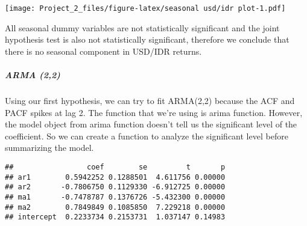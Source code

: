 \documentclass[]{article}
\newenvironment{Shaded}{\begin{snugshade}}{\end{snugshade}}
\newcommand{\KeywordTok}[1]{\textcolor[rgb]{0.13,0.29,0.53}{\textbf{#1}}}
\newcommand{\DataTypeTok}[1]{\textcolor[rgb]{0.13,0.29,0.53}{#1}}
\newcommand{\DecValTok}[1]{\textcolor[rgb]{0.00,0.00,0.81}{#1}}
\newcommand{\StringTok}[1]{\textcolor[rgb]{0.31,0.60,0.02}{#1}}
\newcommand{\CommentTok}[1]{\textcolor[rgb]{0.56,0.35,0.01}{\textit{#1}}}
\newcommand{\OtherTok}[1]{\textcolor[rgb]{0.56,0.35,0.01}{#1}}
\newcommand{\ControlFlowTok}[1]{\textcolor[rgb]{0.13,0.29,0.53}{\textbf{#1}}}
\newcommand{\OperatorTok}[1]{\textcolor[rgb]{0.81,0.36,0.00}{\textbf{#1}}}
\newcommand{\NormalTok}[1]{#1}
\let\oldsubparagraph\subparagraph
\renewcommand{\subparagraph}[1]{\oldsubparagraph{#1}\mbox{}}
\begin{document}
\texttt{[image: Project\_2\_files/figure-latex/seasonal usd/idr plot-1.pdf]}

All seasonal dummy variables are not statistically significant and the
joint hypothesis test is also not statistically significant, therefore
we conclude that there is no seasonal component in USD/IDR returns.

\subparagraph{ARMA (2,2)}\label{arma-22}

Using our first hypothesis, we can try to fit ARMA(2,2) because the ACF
and PACF spikes at lag 2. The function that we're using is arima
function. However, the model object from arima function doesn't tell us
the significant level of the coefficient. So we can create a function to
analyze the significant level before summarizing the model.

\begin{Shaded}
\end{Shaded}

\begin{verbatim}
##                 coef        se         t       p
## ar1        0.5942252 0.1288501  4.611756 0.00000
## ar2       -0.7806750 0.1129330 -6.912725 0.00000
## ma1       -0.7478787 0.1376726 -5.432300 0.00000
## ma2        0.7849849 0.1085850  7.229218 0.00000
## intercept  0.2233734 0.2153731  1.037147 0.14983
\end{verbatim}
\end{document}
